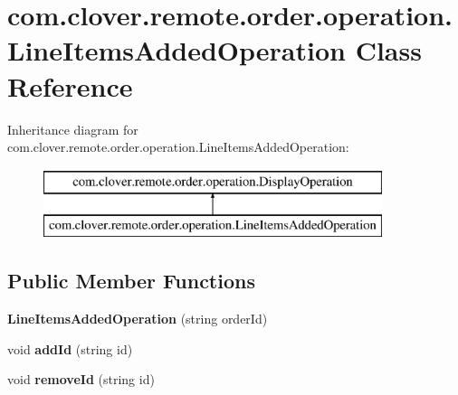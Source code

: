 \hypertarget{classcom_1_1clover_1_1remote_1_1order_1_1operation_1_1_line_items_added_operation}{}\section{com.\+clover.\+remote.\+order.\+operation.\+Line\+Items\+Added\+Operation Class Reference}
\label{classcom_1_1clover_1_1remote_1_1order_1_1operation_1_1_line_items_added_operation}
Inheritance diagram for com.\+clover.\+remote.\+order.\+operation.\+Line\+Items\+Added\+Operation\+:\begin{figure}[H]
\begin{center}
\leavevmode
\includegraphics[height=2.000000cm]{classcom_1_1clover_1_1remote_1_1order_1_1operation_1_1_line_items_added_operation}
\end{center}
\end{figure}
\subsection*{Public Member Functions}
\begin{DoxyCompactItemize}
\item 
\mbox{\label{classcom_1_1clover_1_1remote_1_1order_1_1operation_1_1_line_items_added_operation_ab109a9949d9ba4460769a032cfe61240}} 
{\bfseries Line\+Items\+Added\+Operation} (string order\+Id)
\item 
\mbox{\label{classcom_1_1clover_1_1remote_1_1order_1_1operation_1_1_line_items_added_operation_a9e1a1b5bd68d21d4487e500d388dd231}} 
void {\bfseries add\+Id} (string id)
\item 
\mbox{\label{classcom_1_1clover_1_1remote_1_1order_1_1operation_1_1_line_items_added_operation_a22370803700751191608d75f904d400e}} 
void {\bfseries remove\+Id} (string id)
\end{DoxyCompactItemize}
